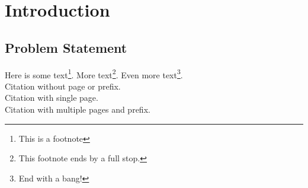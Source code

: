 \section{Introduction}
\label{sec:Introduction}
\subsection{Problem Statement}
\label{subsec:ProblemStatement}
Here is some text\footnote{This is a footnote}. More text\footnote{This footnote ends by a full stop.}. Even more text\footnote{End with a bang!}.\\
Citation without page or prefix.\autocite{Ihaka.1996}\\
Citation with single page.\autocite[299]{Ihaka.1996}\\
Citation with multiple pages and prefix.\autocite[cf.][299-301, 303, 305-307]{Ihaka.1996}
